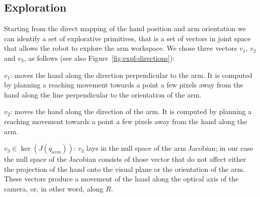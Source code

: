 \subsection{Exploration}
Starting from the direct mapping of the hand position and arm orientation we
can identify a set of explorative primitives, that is a set of vectors in
joint space that allows the robot to explore the arm workspace. We chose three
vectors $v_1$, $v_2$ and $v_3$, as follows (see also 
Figure~\ref{fig:expl-directions}):

$v_1$: moves the hand along the
direction perpendicular to the arm. It is computed by planning a 
reaching movement towards a point a few pixels away from the hand along the
line perpendicular to the orientation of the arm.

$v_2$: moves the hand along the
direction of the arm. It is computed by planning a 
reaching movement towards a point a few pixels away from the hand along the 
arm.

$v_3\in \ker \left(J\left(q_{arm}\right)\right)$: $v_3$ lays in the null 
space of the arm Jacobian; in our case the null space of the Jacobian 
consists of those vector that do not affect
either the projection of the hand onto the visual plane or the orientation
of the arm. These vectors produce a movement of the hand along the optical
axis of the camera, or, in other word, along $R$.
%
